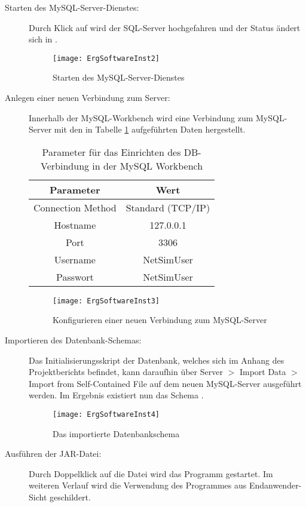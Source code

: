 \begin{description}
\item [Starten des MySQL-Server-Dienstes:]
Durch Klick auf  wird der SQL-Server hochgefahren und der Status ändert sich in .
\begin{figure}[ht]
	\centering
	\texttt{[image: ErgSoftwareInst2]}
	\caption{Starten des MySQL-Server-Dienstes}
	\label{fig:ErgSoftwareInst2}
\end{figure}
\item [Anlegen einer neuen Verbindung zum Server:]
Innerhalb der MySQL-Workbench wird eine Verbindung zum MySQL-Server mit den in Tabelle \ref{tab:mysql} aufgeführten Daten hergestellt.
\begin{table}[ht]
\centering
\caption{Parameter für das Einrichten des DB-Verbindung in der MySQL Workbench}
\label{tab:mysql}
	 \begin{tabular}{cc}
	\textbf{Parameter} & \textbf{Wert}\\
	\hline
	\hline
	Connection Method & Standard (TCP/IP)\\
	 \hline
	Hostname & 127.0.0.1\\
	 \hline
	Port & 3306\\
	 \hline
	Username & NetSimUser\\
	 \hline
	Passwort & NetSimUser\\
	 \end{tabular}
\end{table}
\begin{figure}[ht]
	\centering
	\texttt{[image: ErgSoftwareInst3]}
	\caption{Konfigurieren einer neuen Verbindung zum MySQL-Server}
	\label{fig:ErgSoftwareInst3}
\end{figure}
\item [Importieren des Datenbank-Schemas:] Das Initialisierungsskript der Datenbank, welches sich im Anhang des Projektberichts befindet, kann daraufhin über Server $ > $ Import Data $ > $ Import from Self-Contained File auf dem neuen MySQL-Server ausgeführt werden. Im Ergebnis existiert nun das Schema .
\begin{figure}[ht]
	\centering
	\texttt{[image: ErgSoftwareInst4]}
	\caption{Das importierte Datenbankschema }
	\label{fig:ErgSoftwareInst4}
\end{figure}
\item [Ausführen der JAR-Datei:] Durch Doppelklick auf die Datei  wird das Programm gestartet. Im weiteren Verlauf wird die Verwendung des Programmes aus Endanwender-Sicht geschildert.
\end{description}

